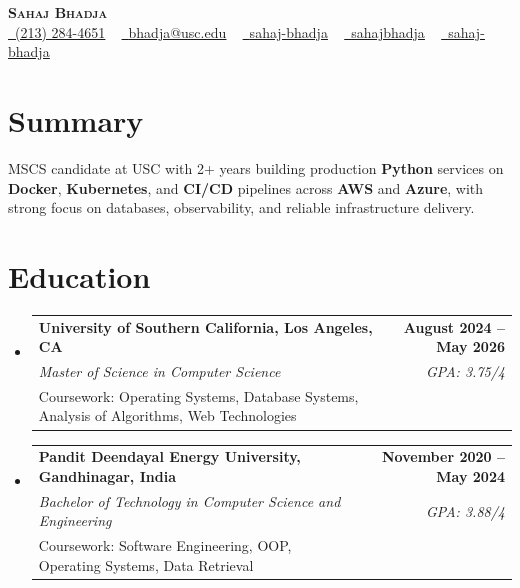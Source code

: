 \documentclass[letterpaper,10pt]{article}
\makeatletter
\newcommand{\resumeEduSubheading}[5]{\vspace{-1pt}\item\begin{tabular*}{1.0\textwidth}[t]{l@{\extracolsep{\fill}}r}\textbf{#1} & \textbf{\small #2} \\\textit{\small #3} & \textit{\small #4} \\\small #5 & \\\end{tabular*}\vspace{-4pt}}
\newcommand{\resumeSubHeadingListStart}{\begin{itemize}[leftmargin=0.0in, label={}]}
\newcommand{\resumeSubHeadingListEnd}{\end{itemize}}
\makeatother
\begin{document}
\begin{center}
{\Huge \scshape \textbf{Sahaj Bhadja}} \\ \vspace{1pt}
\small \href{tel:(213) 284-4651}{\faPhone\ \underline{(213) 284-4651}} ~ \href{mailto: bhadja@usc.edu}{\raisebox{-0.2\height}\faEnvelope\ \underline{bhadja@usc.edu}} ~
\href{https://www.linkedin.com/in/sahaj-bhadja/}{\raisebox{-0.2\height}\faLinkedin\ \underline{sahaj-bhadja}} ~ \href{https://github.com/SAHAJ-BHADJA}{\raisebox{-0.2\height}\faGithub\ \underline{sahajbhadja}} ~
\href{https://sahaj-bhadja.vercel.app/}{\raisebox{-0.2\height}\faGlobe\ \underline{sahaj-bhadja}}
\end{center}
\vspace{-16pt}
\section{Summary}
\begin{itemize}[leftmargin=0.15in, label={}]
\small{\item{MSCS candidate at USC with 2+ years building production \textbf{Python} services on \textbf{Docker}, \textbf{Kubernetes}, and \textbf{CI/CD} pipelines across \textbf{AWS} and \textbf{Azure}, with strong focus on databases, observability, and reliable infrastructure delivery.}}
\end{itemize}
\vspace{-6pt}
\section{Education}
\resumeSubHeadingListStart
\resumeEduSubheading{University of Southern California, Los Angeles, CA}{August 2024 -- May 2026}{Master of Science in Computer Science}{GPA: 3.75/4}{Coursework: Operating Systems, Database Systems, Analysis of Algorithms, Web Technologies}
\vspace{-9pt}
\resumeEduSubheading{Pandit Deendayal Energy University, Gandhinagar, India}{November 2020 -- May 2024}{Bachelor of Technology in Computer Science and Engineering}{GPA: 3.88/4}{Coursework: Software Engineering, OOP, Operating Systems, Data Retrieval}
\resumeSubHeadingListEnd
\vspace{-6pt}
\end{document}
